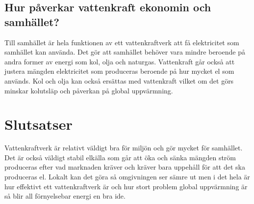 \documentclass[11p]{article}
\begin{document}
 \subsection{Hur påverkar vattenkraft ekonomin och samhället?}
 Till samhället är hela funktionen av ett vattenkraftverk att få elektricitet som samhället kan använda.
 Det gör att samhället behöver vara mindre beroende på andra former av energi som kol, olja och naturgas.
 Vattenkraft går också att justera mängden elektricitet som produceras beroende på hur mycket el som används.
 Kol och olja kan också ersättas med vattenkraft vilket om det görs minskar kolutsläp och påverkan på global uppvärmning.


 \section{Slutsatser}
 Vattenkraftverk är relativt väldigt bra för miljön och gör mycket för samhället.
 Det är också väldigt stabil elkälla som går att öka och sänka mängden ström produceras efter vad marknaden kräver och kräver bara uppehåll för att det ska produceras el.
 Lokalt kan det göra så omgivningen ser sämre ut men i det hela är hur effektivt ett vattenkraftverk är och hur stort problem global uppvärmning är så blir all förnyelsebar energi en bra ide.


 \printbibliography
\end{document}
